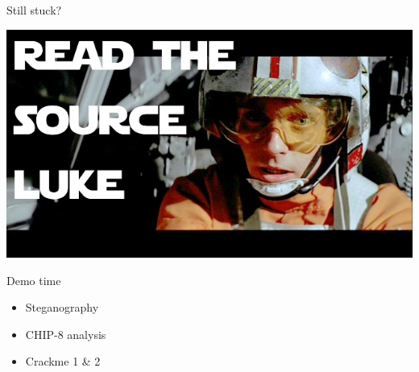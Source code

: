 \documentclass[presentation]{beamer}
\begin{document}
\begin{frame}[label={sec:org3423b82}]{Still stuck?}
\begin{center}
\includegraphics[width=.9\linewidth]{./img/source-luke.jpg}
\end{center}
\end{frame}

\begin{frame}[label={sec:org10bba30}]{Demo time}
\begin{itemize}
\item Steganography
\item CHIP-8 analysis
\item Crackme 1 \& 2
\end{itemize}
\end{frame}
\end{document}
